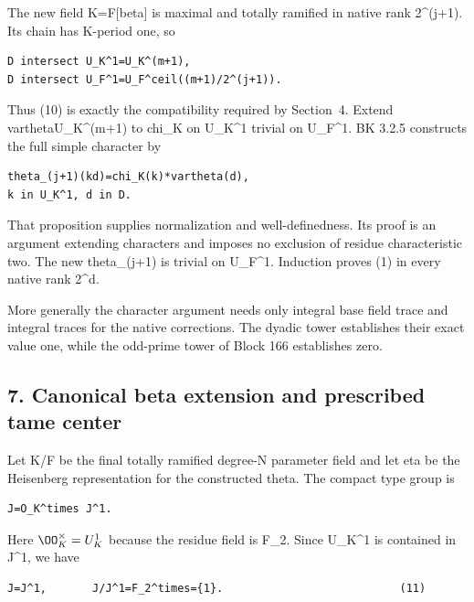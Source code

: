The new field K=F{[}beta{]} is maximal and totally ramified in native
rank 2\^{}(j+1). Its chain has K-period one, so

\begin{Verbatim}[fontsize=\small,breaklines=true,breakanywhere=true]
D intersect U_K^1=U_K^(m+1),
D intersect U_F^1=U_F^ceil((m+1)/2^(j+1)).
\end{Verbatim}

Thus (10) is exactly the compatibility required by Section~4. Extend
vartheta\textbar U\_K\^{}(m+1) to chi\_K on U\_K\^{}1 trivial on
U\_F\^{}1. BK 3.2.5 constructs the full simple character by

\begin{Verbatim}[fontsize=\small,breaklines=true,breakanywhere=true]
theta_(j+1)(kd)=chi_K(k)*vartheta(d),
k in U_K^1, d in D.
\end{Verbatim}

That proposition supplies normalization and well-definedness. Its proof is an argument extending characters and imposes no exclusion of residue
characteristic two. The new theta\_(j+1) is trivial on U\_F\^{}1.
Induction proves (1) in every native rank 2\^{}d.

More generally the character argument needs only integral base field
trace and integral traces for the native corrections. The dyadic tower
establishes their exact value one, while the odd-prime tower of Block 166
establishes zero.

\hypertarget{dyadic_character-canonical-beta-extension-and-prescribed-tame-center}{%
\subsection{7. Canonical beta extension and prescribed tame
center}\label{dyadic_character-canonical-beta-extension-and-prescribed-tame-center}}

Let K/F be the final totally ramified degree-N parameter field and let
eta be the Heisenberg representation for the constructed theta. The
compact type group is

\begin{Verbatim}[fontsize=\small,breaklines=true,breakanywhere=true]
J=O_K^times J^1.
\end{Verbatim}

Here \(\OO_K^\times=U_K^1\) because the residue field is
F\_2. Since U\_K\^{}1 is contained in J\^{}1, we have

\begin{Verbatim}[fontsize=\small,breaklines=true,breakanywhere=true]
J=J^1,       J/J^1=F_2^times={1}.                           (11)
\end{Verbatim}

